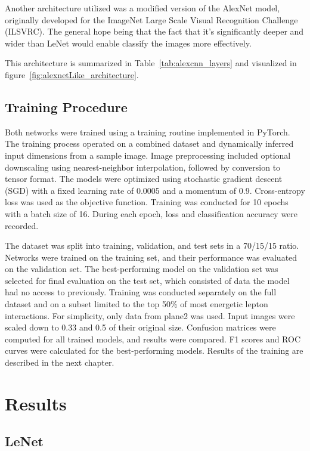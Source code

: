 \documentclass{pracalicmgr}
\begin{document}
Another architecture utilized was a modified version of the AlexNet model, originally developed for the ImageNet Large Scale Visual Recognition Challenge (ILSVRC). The general hope being that the fact that it's significantly deeper and wider than LeNet would enable classify the images more effectively\cite{AlexNETpub}.

This architecture is summarized in Table~\ref{tab:alexcnn_layers} and visualized in figure~\ref{fig:alexnetLike_architecture}.

\subsection{Training Procedure}

Both networks were trained using a training routine implemented in PyTorch. The training process operated on a combined dataset and dynamically inferred input dimensions from a sample image. Image preprocessing included optional downscaling using nearest-neighbor interpolation, followed by conversion to tensor format. The models were optimized using stochastic gradient descent (SGD) with a fixed learning rate of 0.0005 and a momentum of 0.9. Cross-entropy loss was used as the objective function. Training was conducted for 10 epochs with a batch size of 16. During each epoch, loss and classification accuracy were recorded.

The dataset was split into training, validation, and test sets in a 70/15/15 ratio. Networks were trained on the training set, and their performance was evaluated on the validation set. The best-performing model on the validation set was selected for final evaluation on the test set, which consisted of data the model had no access to previously. Training was conducted separately on the full dataset and on a subset limited to the top 50\% of most energetic lepton interactions. For simplicity, only data from plane2 was used. Input images were scaled down to 0.33 and 0.5 of their original size. Confusion matrices were computed for all trained models, and results were compared. F1 scores and ROC curves were calculated for the best-performing models. Results of the training are described in the next chapter.

\section{Results}

\subsection{LeNet}
\end{document}
